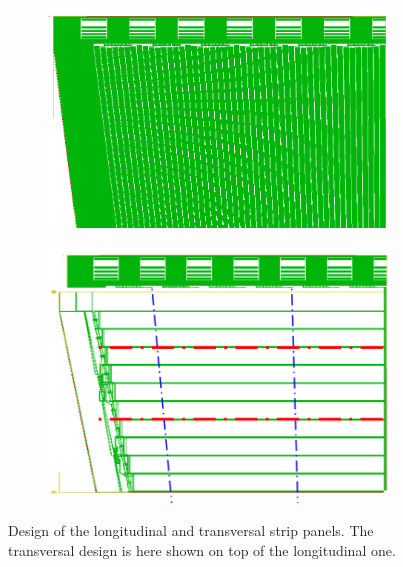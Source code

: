 	\begin{figure}[H]
		\begin{subfigure}{.5\linewidth}
		    \centering
			\includegraphics[width = \linewidth]{fig/chapt6/INFN-FEB-Longitudinal-Drawing.png}
			\caption{\label{fig:INFN_Readout:A}}
		\end{subfigure}
		\begin{subfigure}{.5\linewidth}
		    \centering
			\includegraphics[width = .9\linewidth]{fig/chapt6/INFN-FEB-Transversal-Drawing.png}
			\caption{\label{fig:INFN_Readout:B}}
		\end{subfigure}
		\caption{\label{fig:INFN_Readout} Design of the longitudinal  and transversal  strip panels. The transversal design is here shown on top of the longitudinal one.}
    \end{figure}
    
